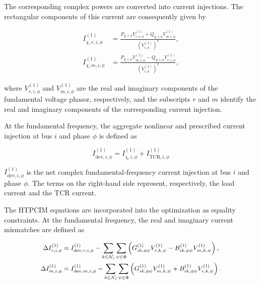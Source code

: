 \documentclass[journal]{IEEEtran}
\begin{document}
The corresponding complex powers are converted into current
injections. The rectangular components of this current are consequently given by

\begin{subequations}
\label{eq:load_current_rectangular}
\begin{align}
    I_{\chi,r,i,\phi}^{(1)}&=
    \frac{P_{\chi,i,\phi}V_{r,i,\phi}^{(1)}+
    Q_{\chi,i,\phi}V_{m,i,\phi}^{(1)}}
    {\left(V_{i,\phi}^{(1)}\right)^2},\\
    I_{\chi,m,i,\phi}^{(1)}&=
    \frac{P_{\chi,i,\phi}V_{m,i,\phi}^{(1)}-
    Q_{\chi,i,\phi}V_{r,i,\phi}^{(1)}}
    {\left(V_{i,\phi}^{(1)}\right)^2},
\end{align}
\end{subequations}

\noindent where $V_{r,i,\phi}^{(1)}$ and $V_{m,i,\phi}^{(1)}$ are the real and
imaginary components of the fundamental voltage phasor, respectively,
and the subscripts $r$ and $m$ identify the real and imaginary
components of the corresponding current injection.





At the fundamental frequency, the aggregate nonlinear and prescribed
current injection at bus $i$ and phase $\phi$ is defined as

\begin{equation}
    I_{\mathrm{dev},i,\phi}^{(1)}=
    I_{\mathrm{\chi},i,\phi}^{(1)}+
    I_{\mathrm{TCR},i,\phi}^{(1)}
    \label{eq:aggregate_fundamental_current}
\end{equation}


$I_{\mathrm{dev},i,\phi}^{(1)}$ is the net complex
fundamental-frequency current injection at bus $i$ and phase $\phi$.
The terms on the right-hand side represent, respectively, the
 load current and the
TCR current.



The HTPCIM equations are incorporated into the optimization as
equality constraints. At the fundamental frequency, the real and
imaginary current mismatches are defined as

\begin{subequations}\small
\label{eq:fundamental_mismatch}
\begin{align}
    \Delta I_{r,i,\phi}^{(1)}
    &=I_{\mathrm{dev},r,i,\phi}^{(1)}-
    \sum_{k\in\mathcal{N}_i}\sum_{\psi\in\Phi}
    \left(G_{ik,\phi\psi}^{(1)}V_{r,k,\psi}^{(1)}-
    B_{ik,\phi\psi}^{(1)}V_{m,k,\psi}^{(1)}\right),\\
    \Delta I_{m,i,\phi}^{(1)}
    &=I_{\mathrm{dev},m,i,\phi}^{(1)}-
    \sum_{k\in\mathcal{N}_i}\sum_{\psi\in\Phi}
    \left(G_{ik,\phi\psi}^{(1)}V_{m,k,\psi}^{(1)}+
    B_{ik,\phi\psi}^{(1)}V_{r,k,\psi}^{(1)}\right).
\end{align}
\end{subequations}
\end{document}
